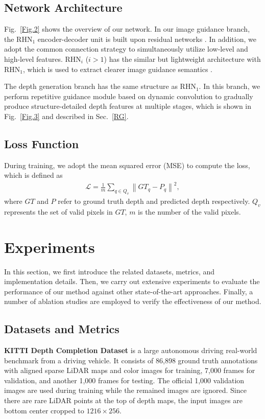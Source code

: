 \documentclass[runningheads]{llncs}
\begin{document}
\subsection{Network Architecture}
Fig.~\ref{Fig.2} shows the overview of our network. In our image guidance branch, the RHN$_1$ encoder-decoder unit is built upon residual networks \cite{He2016Deep}. In addition, we adopt the common connection strategy \cite{ronneberger2015u,chen2019learning} to simultaneously utilize low-level and high-level features. RHN$_i$ ($i>1$) has the similar but lightweight architecture with RHN$_1$, which is used to extract clearer image guidance semantics \cite{zeiler2014visualizing}. 

The depth generation branch has the same structure as RHN$_1$. In this branch, we perform repetitive guidance module based on dynamic convolution to gradually produce structure-detailed depth features at multiple stages, which is shown in Fig.~\ref{Fig.3} and described in Sec.~\ref{RG}. 

\subsection{Loss Function}
During training, we adopt the mean squared error (MSE) to compute the loss, which is defined as
\begin{equation}\label{e9}
\begin{split}
\mathcal{L}=\frac{1}{m}\sum\limits_{q\in {{Q}_{v}}}{\left\| GT_{q}-{P}_{q} \right\|}^{2},
\end{split}
\end{equation}
where $GT$ and $P$ refer to ground truth depth and predicted depth respectively. $Q_v$ represents the set of valid pixels in $GT$, $m$ is the number of the valid pixels.



\section{Experiments}
In this section, we first introduce the related datasets, metrics, and implementation details. Then, we carry out extensive experiments to evaluate the performance of our method against other state-of-the-art approaches. Finally, a number of ablation studies are employed to verify the effectiveness of our method.

\subsection{Datasets and Metrics}
\textbf{KITTI Depth Completion Dataset} \cite{Uhrig2017THREEDV} is a large autonomous driving real-world benchmark from a driving vehicle. It consists of 86,898 ground truth annotations with aligned sparse LiDAR maps and color images for training, 7,000 frames for validation, and another 1,000 frames for testing. The official 1,000 validation images are used during training while the remained images are ignored. Since there are rare LiDAR points at the top of depth maps, the input images are bottom center cropped \cite{vangansbeke2019,tang2020learning,zhao2021adaptive,liu2021fcfr} to $1216\times 256$.
\end{document}
